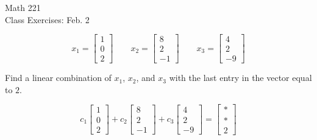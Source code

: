 \documentclass[11pt]{article}
\begin{document}
\begin{center}
\Large
\rm{Math 221}
\\
\rm{Class Exercises:  Feb. 2}
\\
\end{center}
\vspace{0.2in}



\begin{displaymath}
x_1 = \left[ \begin{array}{r} 1 \\ 0 \\ 2 \end{array}\right]
\quad\quad
x_2 = \left[ \begin{array}{r} 8 \\ 2 \\ -1 \end{array}\right]
\quad\quad
x_3 = \left[ \begin{array}{r} 4 \\ 2 \\ -9 \end{array}\right]
\end{displaymath}

\vspace{0.5in}

Find a linear combination of $x_1$, $x_2$, and $x_3$ with the last entry in the vector equal to $2$.

\vspace{0.1in}

\begin{displaymath}
c_1\left[ \begin{array}{r} 1 \\ 0 \\ 2 \end{array}\right]
+
c_2\left[ \begin{array}{r} 8 \\ 2 \\ -1 \end{array}\right]
+
c_3\left[ \begin{array}{r} 4 \\ 2 \\ -9 \end{array}\right]=
\left[ \begin{array}{r} * \\ * \\ 2 \end{array}\right]
\end{displaymath}
\end{document}
